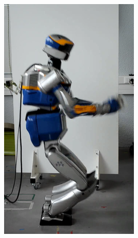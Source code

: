 \begin{figure}
\begin{subfigure}{0.19\columnwidth}
    \centering
    \includegraphics[width = \columnwidth]
                    {src/chap3-optimal-motion-planning/figure/self-collision-3.png}
    \label{self-collision-3}
  \end{subfigure}
  \begin{subfigure}{0.19\columnwidth}
    \centering

\end{subfigure}
\end{figure}
